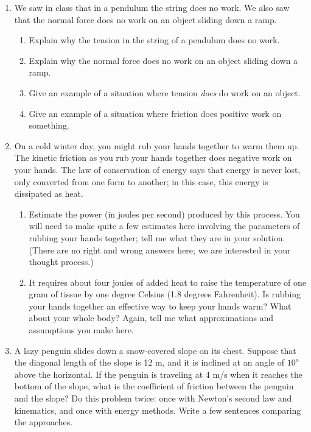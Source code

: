 \documentclass[12pt]{article}
\begin{document}
	\Large
	\centerline{}
	\normalsize
	\centerline{}
	
	\begin{enumerate}
		
		\item{We saw in class that in a pendulum the string does no work. We also saw that the normal force does no work on an object sliding down a ramp.}
		\begin{enumerate}
			\item{Explain why the tension in the string of a pendulum does no work.}
			\item{Explain why the normal force does no work on an object sliding down a ramp.}
			\item{Give an example of a situation where tension {\it does} do work on an object.}
			\item{Give an example of a situation where friction does positive work on something.}
		\end{enumerate}

\item On a cold winter day, you might rub your hands together to warm them up. The kinetic friction as you rub your hands together does negative work on your hands.
The law of conservation of energy says that energy is never lost, only converted from one form to another; in this case,
this energy is dissipated as heat. 
\begin{enumerate}
\item Estimate the power (in joules per second) produced by this process. You will need to make quite a few estimates here involving the
parameters of rubbing your hands together; tell me what they are in your solution. (There are no right and wrong answers here; we are interested in your thought process.)
\item It requires about four joules of added heat to raise the temperature of one gram of tissue by one degree Celsius (1.8 degrees Fahrenheit). 
Is rubbing your hands together an effective way to keep your hands warm?
What about your whole body? Again, tell me what approximations and assumptions you make here. 
\end{enumerate}

 \item{A lazy penguin slides down a snow-covered slope on its chest. Suppose that the diagonal length of the slope is 12 m, and it is inclined at an angle of $10^o$ above the horizontal. If the penguin is traveling at 4 m/s when it 
	reaches the bottom of the slope, what is the coefficient of friction between the penguin and the slope? Do this problem twice: once with Newton's second law and kinematics, and once with energy methods. Write a few sentences comparing the 
	approaches.}


\end{enumerate}
\end{document}
